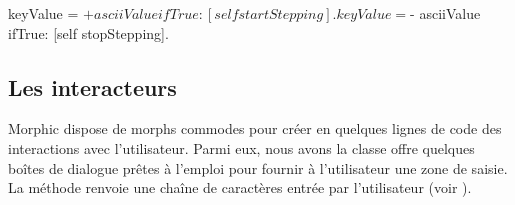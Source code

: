 \documentclass[a4paper,10pt,twoside]{book}
\begin{document}

\begin{code}{}
	keyValue = $+ asciiValue 
		ifTrue: [self startStepping].
	keyValue = $- asciiValue
		ifTrue: [self stopStepping].
\end{code}


\subsection{Les interacteurs} %

Morphic dispose de morphs commodes pour créer en quelques lignes de
code des interactions avec l'utilisateur. Parmi eux, nous avons la
classe  offre quelques boîtes de dialogue
prêtes à l'emploi pour fournir à l'utilisateur une zone de saisie.
La méthode  renvoie
une chaîne de caractères entrée par l'utilisateur (voir
).
\end{document}
